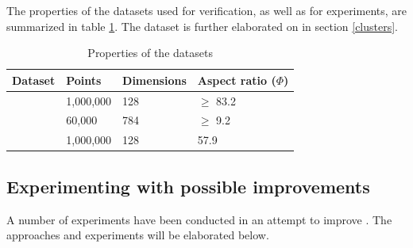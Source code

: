 The properties of the datasets used for verification, as well as for experiments, are summarized in table \ref{tab:datasets}. The \clust{} dataset is further elaborated on in section \ref{clusters}.

\begin{table}[h]
	\centering
	\begin{tabular}{l l l l}
		\hline
		Dataset & Points & Dimensions & Aspect ratio ($\Phi$) \\
		\hline
		\sift{} & 1,000,000 & 128 & $\geq$ 83.2 \\
		\mnist{} & 60,000 & 784 & $\geq$ 9.2 \\
		\clust{} & 1,000,000 & 128 & 57.9 \\
		\hline
	\end{tabular}
	\caption{Properties of the datasets}
	\label{tab:datasets}
\end{table}

\subsection{Experimenting with possible improvements}
A number of experiments have been conducted in an attempt to improve \qs{}. The approaches and experiments will be elaborated below.
